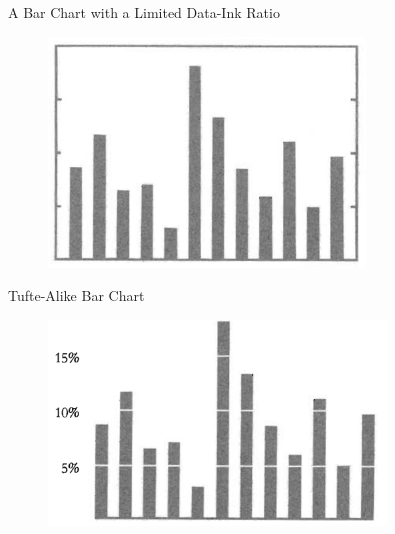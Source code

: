 \documentclass[notes, aspectratio=1610]{beamer}
\begin{document}
\begin{frame}{A Bar Chart with a Limited Data-Ink Ratio}{}
\begin{figure}
		\begin{center}
			\includegraphics[width=0.75\textwidth]{images/trad_barchart.png}
		\end{center}
	\end{figure}

\end{frame}

\begin{frame}{Tufte-Alike Bar Chart}{}
\begin{figure}
		\begin{center}
			\includegraphics[width=0.8\textwidth]{images/tufte_barchart.png}
		\end{center}
	\end{figure}

\end{frame}
\end{document}
